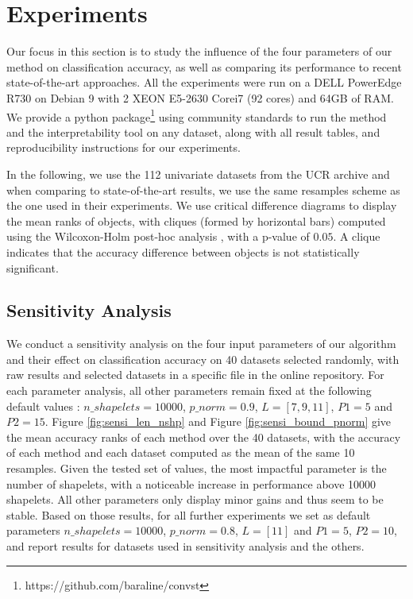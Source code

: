 \section{Experiments}
\label{sec:Experiments}
Our focus in this section is to study the influence of the four parameters of our method on classification accuracy, as well as comparing its performance to recent state-of-the-art approaches. All the experiments were run on a DELL PowerEdge R730 on Debian 9 with 2 XEON E5-2630 Corei7 (92 cores) and 64GB of RAM. We provide a python package\footnote{https://github.com/baraline/convst} using community standards to run the method and the interpretability tool on any dataset, along with all result tables, and reproducibility instructions for our experiments.

In the following, we use the 112 univariate datasets from the UCR archive \cite{Dataset} and when comparing to state-of-the-art results, we use the same resamples scheme as the one used in their experiments. We use critical difference diagrams to display the mean ranks of objects, with cliques (formed by horizontal bars) computed using the Wilcoxon-Holm post-hoc analysis \cite{CriticalDiagram}, with a p-value of $0.05$. A clique indicates that the accuracy difference between objects is not statistically significant. 

\subsection{Sensitivity Analysis}
We conduct a sensitivity analysis on the four input parameters of our algorithm and their effect on classification accuracy on 40 datasets selected randomly, with raw results and selected datasets in a specific file in the online repository. 
For each parameter analysis, all other parameters remain fixed at the following default values : $n\_shapelets = 10000$, $p\_norm=0.9$, $L=[7,9,11]$, $P1=5$ and $P2=15$. Figure \ref{fig:sensi_len_nshp} and Figure \ref{fig:sensi_bound_pnorm} give the mean accuracy ranks of each method over the 40 datasets, with the accuracy of each method and each dataset computed as the mean of the same 10 resamples.
Given the tested set of values, the most impactful parameter is the number of shapelets, with a noticeable increase in performance above 10000 shapelets. All other parameters only display minor gains and thus seem to be stable. Based on those results, for all further experiments we set as default parameters $n\_shapelets = 10000$, $p\_norm=0.8$, $L=[11]$ and $P1=5$, $ P2=10$, and report results for datasets used in sensitivity analysis and the others.

